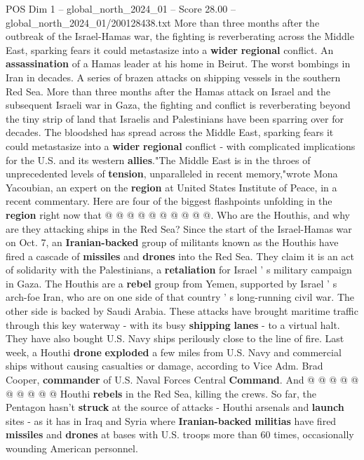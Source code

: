 \begin{textsample}{POS Dim 1 – global\_north\_2024\_01 – Score 28.00 – global\_north\_2024\_01/200128438.txt}  \label{ex:f1_pos_125}
More than three months after the outbreak of the Israel-Hamas war, the fighting is reverberating across the Middle East, sparking fears it could metastasize into a \textbf{wider} \textbf{regional} conflict.
An \textbf{assassination} of a Hamas leader at his home in Beirut.
The worst bombings in Iran in decades.
A series of brazen attacks on shipping vessels in the southern Red Sea.
More than three months after the Hamas attack on Israel and the subsequent Israeli war in Gaza, the fighting and conflict is reverberating beyond the tiny strip of land that Israelis and Palestinians have been sparring over for decades.
The bloodshed has spread across the Middle East, sparking fears it could metastasize into a \textbf{wider} \textbf{regional} conflict - with complicated implications for the U.S. and its western \textbf{allies}."The Middle East is in the throes of unprecedented levels of \textbf{tension}, unparalleled in recent memory,"wrote Mona Yacoubian, an expert on the \textbf{region} at United States Institute of Peace, in a recent commentary.
Here are four of the biggest flashpoints unfolding in the \textbf{region} right now that @ @ @ @ @ @ @ @ @ @.
Who are the Houthis, and why are they attacking ships in the Red Sea?
Since the start of the Israel-Hamas war on Oct. 7, an \textbf{Iranian-backed} group of militants known as the Houthis have fired a cascade of \textbf{missiles} and \textbf{drones} into the Red Sea.
They claim it is an act of solidarity with the Palestinians, a \textbf{retaliation} for Israel ' s military campaign in Gaza.
The Houthis are a \textbf{rebel} group from Yemen, supported by Israel ' s arch-foe Iran, who are on one side of that country ' s long-running civil war.
The other side is backed by Saudi Arabia.
These attacks have brought maritime traffic through this key waterway - with its busy \textbf{shipping} \textbf{lanes} - to a virtual halt.
They have also bought U.S.
Navy ships perilously close to the line of fire.
Last week, a Houthi \textbf{drone} \textbf{exploded} a few miles from U.S.
Navy and commercial ships without causing casualties or damage, according to Vice Adm.
Brad Cooper, \textbf{commander} of U.S.
Naval Forces Central \textbf{Command}.
And @ @ @ @ @ @ @ @ @ @ Houthi \textbf{rebels} in the Red Sea, killing the crews.
So far, the Pentagon hasn't \textbf{struck} at the source of attacks - Houthi arsenals and \textbf{launch} sites - as it has in Iraq and Syria where \textbf{Iranian-backed} \textbf{militias} have fired \textbf{missiles} and \textbf{drones} at bases with U.S. troops more than 60 times, occasionally wounding American personnel.

\end{textsample}

